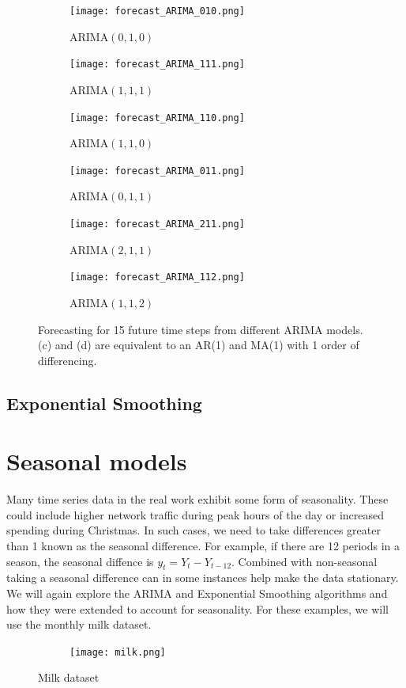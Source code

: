 \documentclass{article}
\begin{document}
  \begin{figure}[H]
    \centering
    \captionsetup{justification=centering}
    \begin{subfigure}[b]{0.49\linewidth}
      \texttt{[image: forecast\_ARIMA\_010.png]}
      \caption{ARIMA$(0, 1, 0)$}
    \end{subfigure}
    \begin{subfigure}[b]{0.49\linewidth}
      \texttt{[image: forecast\_ARIMA\_111.png]}
      \caption{ARIMA$(1, 1, 1)$}
    \end{subfigure}
    \begin{subfigure}[b]{0.49\linewidth}
      \texttt{[image: forecast\_ARIMA\_110.png]}
      \caption{ARIMA$(1, 1, 0)$}
    \end{subfigure}
    \begin{subfigure}[b]{0.49\linewidth}
      \texttt{[image: forecast\_ARIMA\_011.png]}
      \caption{ARIMA$(0, 1, 1)$}
    \end{subfigure}
    \begin{subfigure}[b]{0.49\linewidth}
      \texttt{[image: forecast\_ARIMA\_211.png]}
      \caption{ARIMA$(2, 1, 1)$}
    \end{subfigure}
    \begin{subfigure}[b]{0.49\linewidth}
      \texttt{[image: forecast\_ARIMA\_112.png]}
      \caption{ARIMA$(1, 1, 2)$}
    \end{subfigure}
    \caption{Forecasting for 15 future time steps from different ARIMA models. (c) and (d) are equivalent to an AR(1) and MA(1) with 1 order of differencing.}
  \end{figure}


  \subsection{Exponential Smoothing}
  
  \section{Seasonal models}
  Many time series data in the real work exhibit some form of seasonality. These could include higher network traffic during peak hours of the day or increased spending during Christmas. In such cases, we need to take differences greater than 1 known as the seasonal difference. For example, if there are 12 periods in a season, the seasonal diffence is $y_t = Y_t - Y_{t-12}$. Combined with non-seasonal taking a seasonal difference can in some instances help make the data stationary. We will again explore the ARIMA and Exponential Smoothing algorithms and how they were extended to account for seasonality. For these examples, we will use the monthly milk dataset.
  \begin{figure}[H]
    \centering
    \captionsetup{justification=centering}
    \begin{subfigure}[b]{\linewidth}
      \texttt{[image: milk.png]}
    \end{subfigure}
    \caption{Milk dataset}
  \end{figure}
\end{document}
